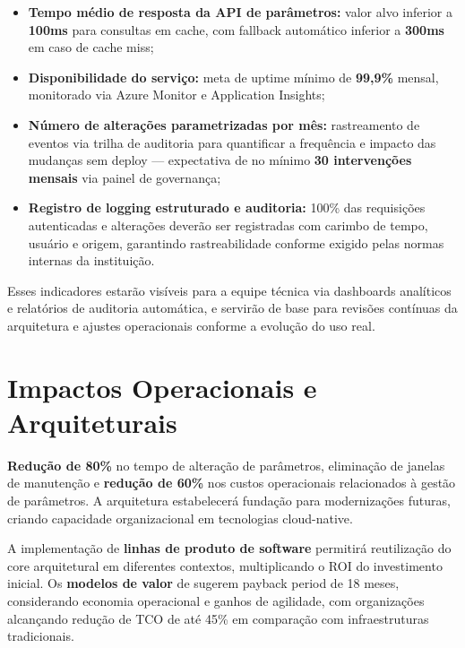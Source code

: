 \begin{itemize}
	\item \textbf{Tempo médio de resposta da API de parâmetros:} valor alvo inferior a \textbf{100ms} para consultas em cache, com fallback automático inferior a \textbf{300ms} em caso de cache miss;
	
	\item \textbf{Disponibilidade do serviço:} meta de uptime mínimo de \textbf{99,9\%} mensal, monitorado via Azure Monitor e Application Insights;
	
	\item \textbf{Número de alterações parametrizadas por mês:} rastreamento de eventos via trilha de auditoria para quantificar a frequência e impacto das mudanças sem deploy — expectativa de no mínimo \textbf{30 intervenções mensais} via painel de governança;
	
	\item \textbf{Registro de logging estruturado e auditoria:} 100\% das requisições autenticadas e alterações deverão ser registradas com carimbo de tempo, usuário e origem, garantindo rastreabilidade conforme exigido pelas normas internas da instituição.
\end{itemize}

Esses indicadores estarão visíveis para a equipe técnica via dashboards analíticos e relatórios de auditoria automática, e servirão de base para revisões contínuas da arquitetura e ajustes operacionais conforme a evolução do uso real.

\section{Impactos Operacionais e Arquiteturais}

\textbf{Redução de 80\%} no tempo de alteração de parâmetros, eliminação de janelas de manutenção e \textbf{redução de 60\%} nos custos operacionais relacionados à gestão de parâmetros. A arquitetura estabelecerá fundação para modernizações futuras, criando capacidade organizacional em tecnologias cloud-native.

A implementação de \textbf{linhas de produto de software}  permitirá reutilização do core arquitetural em diferentes contextos, multiplicando o ROI do investimento inicial. Os \textbf{modelos de valor} de  sugerem payback period de 18 meses, considerando economia operacional e ganhos de agilidade, com organizações alcançando redução de TCO de até 45\% em comparação com infraestruturas tradicionais.

